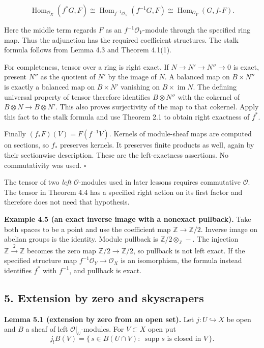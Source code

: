 \documentclass[
  english,
  11pt,
  a4paper,
]{article}
\begin{document}
\[\operatorname{Hom}_{\mathcal O_X}(f^*G,F)
\cong\operatorname{Hom}_{f^{-1}\mathcal O_Y}(f^{-1}G,F)
\cong\operatorname{Hom}_{\mathcal O_Y}(G,f_*F).\]

Here the middle term regards \(F\) as an \(f^{-1}\mathcal O_Y\)-module
through the specified ring map. Thus the adjunction has the required
coefficient structures. The stalk formula follows from Lemma 4.3 and
Theorem 4.1(1).

For completeness, tensor over a ring is right exact. If
\(N\to N'\to N''\to0\) is exact, present \(N''\) as the quotient of
\(N'\) by the image of \(N\). A balanced map on \(B\times N''\) is
exactly a balanced map on \(B\times N'\) vanishing on
\(B\times\operatorname{im}N\). The defining universal property of tensor
therefore identifies \(B\otimes N''\) with the cokernel of
\(B\otimes N\to B\otimes N'\). This also proves surjectivity of the map
to that cokernel. Apply this fact to the stalk formula and use Theorem
2.1 to obtain right exactness of \(f^*\).

Finally \((f_*F)(V)=F(f^{-1}V)\). Kernels of module-sheaf maps are
computed on sections, so \(f_*\) preserves kernels. It preserves finite
products as well, again by their sectionwise description. These are the
left-exactness assertions. No commutativity was used. \(\square\)

The tensor of two \emph{left} \(\mathcal O\)-modules used in later
lessons requires commutative \(\mathcal O\). The tensor in Theorem 4.4
has a specified right action on its first factor and therefore does not
need that hypothesis.

\textbf{Example 4.5 (an exact inverse image with a nonexact pullback).}
Take both spaces to be a point and use the coefficient map
\(\mathbb Z\to\mathbb Z/2\). Inverse image on abelian groups is the
identity. Module pullback is \(\mathbb Z/2\otimes_{\mathbb Z}-\). The
injection \(\mathbb Z\xrightarrow{2}\mathbb Z\) becomes the zero map
\(\mathbb Z/2\to\mathbb Z/2\), so pullback is not left exact. If the
specified structure map \(f^{-1}\mathcal O_Y\to\mathcal O_X\) is an
isomorphism, the formula instead identifies \(f^*\) with \(f^{-1}\), and
pullback is exact.

\subsection{5. Extension by zero and
skyscrapers}\label{sheaves-of-modules-on-a-ringed-space--5-extension-by-zero-and-skyscrapers}

\textbf{Lemma 5.1 (extension by zero from an open set).} Let
\(j:U\hookrightarrow X\) be open and \(B\) a sheaf of left
\(\mathcal O|_U\)-modules. For \(V\subset X\) open put
\[j_!B(V)=\{\,s\in B(U\cap V):\ \operatorname{supp}s\text{ is closed in }V\,\}.\]
\end{document}
